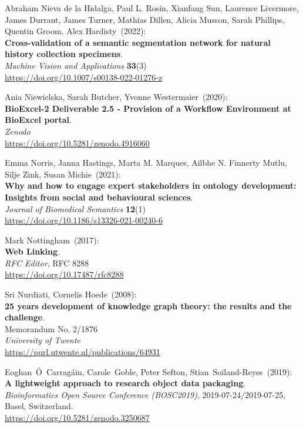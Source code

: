 \begin{thebibliography}{9}
Abraham Nieva de la Hidalga, Paul L. Rosin, Xianfang Sun, Laurence Livermore, James Durrant, James Turner, Mathias Dillen, Alicia Musson, Sarah Phillips, Quentin Groom, Alex Hardisty~(2022): \\
\textbf{Cross-validation of a semantic segmentation network for natural history collection specimens}.\\
\emph{Machine Vision and Applications} \textbf{33}(3)\\
\url{https://doi.org/10.1007/s00138-022-01276-z}

Ania Niewielska, Sarah Butcher, Yvonne Westermaier~(2020): \\
\textbf{BioExcel-2 Deliverable 2.5 - Provision of a Workflow Environment at BioExcel portal}.\\
\emph{Zenodo}\\
\url{https://doi.org/10.5281/zenodo.4916060}

Emma Norris, Janna Hastings, Marta M. Marques, Ailbhe N. Finnerty Mutlu, Silje Zink, Susan Michie~(2021): \\
\textbf{Why and how to engage expert stakeholders in ontology development: Insights from social and behavioural sciences}. \\
\emph{Journal of Biomedical Semantics} \textbf{12}(1) \\
\url{https://doi.org/10.1186/s13326-021-00240-6}

Mark Nottingham~(2017): \\
\textbf{Web {Linking}}.\\
\emph{RFC Editor}, RFC 8288\\
\url{https://doi.org/10.17487/rfc8288}

Sri Nurdiati, Cornelis Hoede~(2008): \\
\textbf{25 years development of knowledge graph theory: the results and the challenge}.\\
Memorandum No. 2/1876\\
\emph{University of Twente}\\
\url{https://purl.utwente.nl/publications/64931}

Eoghan~Ó~Carragáin, Carole~Goble, Peter Sefton, Stian~Soiland-Reyes~(2019): \\
\textbf{A lightweight approach to research object data packaging}.\\
\emph{Bioinformatics Open Source Conference (BOSC2019)},
2019-07-24/2019-07-25, Basel, Switzerland.\\
\url{https://doi.org/10.5281/zenodo.3250687}


\end{thebibliography}
